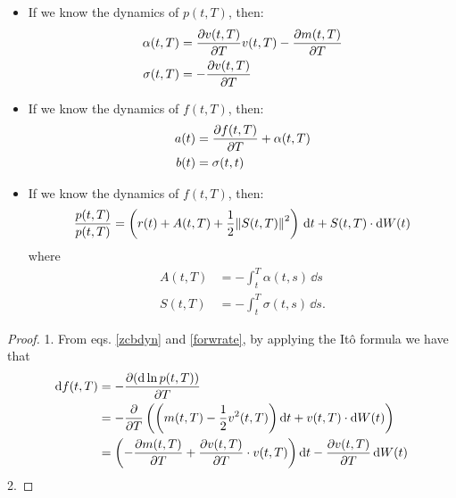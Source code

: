 \begin{theorem}
    \begin{itemize}
        \item If we know the dynamics of $p(t,T)$, then:
        \begin{align}
            \alpha(t,T) &= \pdv{v(t,T)}{T}v(t,T) - \pdv{m(t,T)}{T} \\
            \sigma(t,T) &= -\pdv{v(t,T)}{T}
        \end{align}
        \item If we know the dynamics of $f(t,T)$, then:
        \begin{align}
            a(t) &= \pdv{f(t,T)}{T} + \alpha(t,T) \\
            b(t) &= \sigma(t,t)
        \end{align}
        \item If we know the dynamics of $f(t,T)$, then:
        \begin{align}
            \frac{p(t,T)}{p(t,T)} = \left(r(t) + A(t,T) + \frac{1}{2}\norm{S(t,T)}^2\right)\,\dd t + S(t,T)\cdot \dd W(t)
        \end{align}
        where
        \begin{align}
            A(t,T) &= -\int_t^T \alpha(t,s)\,\dd s \\
            S(t,T) &= -\int_t^T \sigma(t,s)\,\dd s.
        \end{align}
    \end{itemize}
\end{theorem}
\begin{proof}
    1. From eqs. \eqref{zcbdyn} and \eqref{forwrate}, by applying the Itô formula we have that
    \begin{align*}
        \dd f(t,T) &= - \pdv{(\dd\ln p(t,T))}{T}\\
        &=
        - \pdv{}{T} \left(\left(m(t,T) - \frac{1}{2}v^2(t,T)\right)\dd t + v(t,T)\cdot\dd W(t)\right) \\
        &=
        \left(- \pdv{m(t,T)}{T} + \pdv{v(t,T)}{T}\cdot v(t,T)\right)\dd t - \pdv{v(t,T)}{T}\,\dd W(t)
    \end{align*} %
    2. 
\end{proof}
